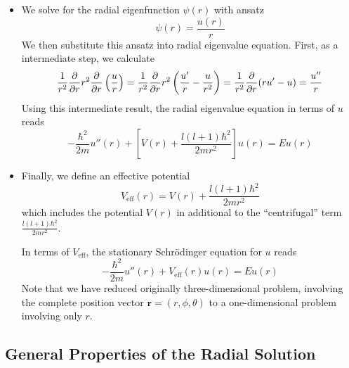 \documentclass[11pt, a4paper]{article}
\newcommand{\Schro}{Schr\"{o}dinger\xspace}
\renewcommand{\vec}[1]{\bm{#1}}  %
\renewcommand{\r}{\vec{r}}  %
\newcommand{\p}{\psi}  %
\begin{document}
\begin{itemize}
	\item We solve for the radial eigenfunction $ \p(r) $ with ansatz
	\begin{equation*}
		\p(r) = \frac{u(r)}{r}
	\end{equation*}
	We then substitute this ansatz into radial eigenvalue equation. First, as a intermediate step, we calculate
	\begin{equation*}
		\frac{1}{r^{2}}\pdv{r}r^{2}\pdv{r} \left(\frac{u}{r}\right) = \frac{1}{r^{2}}\pdv{r}r^{2}\left(\frac{u'}{r} - \frac{u}{r^{2}}\right) = \frac{1}{r^{2}}\pdv{r}(ru' - u) = \frac{u''}{r}
	\end{equation*}
	Using this intermediate result, the radial eigenvalue equation in terms of $ u $ reads
	\begin{equation*}
		-\frac{\hbar^{2}}{2m}u''(r) + \left[V(r) + \frac{l (l+1)\hbar^{2}}{2mr^{2}}\right]u(r) = Eu(r)
	\end{equation*}
	
	\item Finally, we define an effective potential 
	\begin{equation*}
		V_{\text{eff}}(r) = V(r) + \frac{l (l+1)\hbar^{2}}{2mr^{2}}
	\end{equation*}
	which includes the potential $ V(r) $ in additional to the ``centrifugal'' term $ \frac{l (l+1)\hbar^{2}}{2mr^{2}} $.
	
	
	In terms of $ V_{\text{eff}} $, the stationary \Schro equation for $ u $ reads
	\begin{equation*}
	-\frac{\hbar^{2}}{2m}u''(r) + V_{\text{eff}}(r)u(r) = Eu(r)
	\end{equation*}
	Note that we have reduced originally three-dimensional problem, involving the complete position vector $ \r = (r, \phi, \theta)  $ to a one-dimensional problem involving only $ r $.
	
\end{itemize}

\subsection{General Properties of the Radial Solution}
\end{document}
